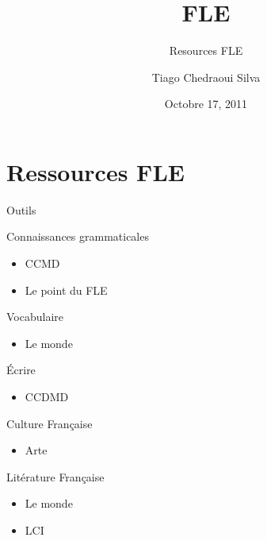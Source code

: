 \documentclass[dvips,11pt,xcolor=dvipsnames]{beamer}
\title{FLE}
\subtitle{Resources FLE}
\author[Tiago S.]{
  Tiago Chedraoui Silva \\
}
\institute{}
\date{Octobre 17, 2011}
\numberwithin{table}{section}
\numberwithin{figure}{section} %
\begin{document}
\begin{frame}
  \titlepage
\end{frame}



\section{Ressources FLE}

\begin{frame}{Outils}
 
 \begin{block}{Connaissances grammaticales}
    \begin{itemize}
    \item  CCMD
    \item Le point du FLE
    \end{itemize}
  \end{block}

 \begin{block}{Vocabulaire}
    \begin{itemize}
    \item Le monde
    \end{itemize}
  \end{block}

 \begin{block}{Écrire}
    \begin{itemize}
    \item CCDMD
    \end{itemize}
  \end{block}

 \begin{block}{Culture Française}
    \begin{itemize}
    \item Arte 
    \end{itemize}
  \end{block}

 \begin{block}{Litérature Française}
    \begin{itemize}
    \item Le monde
    \item LCI
    \end{itemize}
  \end{block}

\end{frame}
\end{document}
